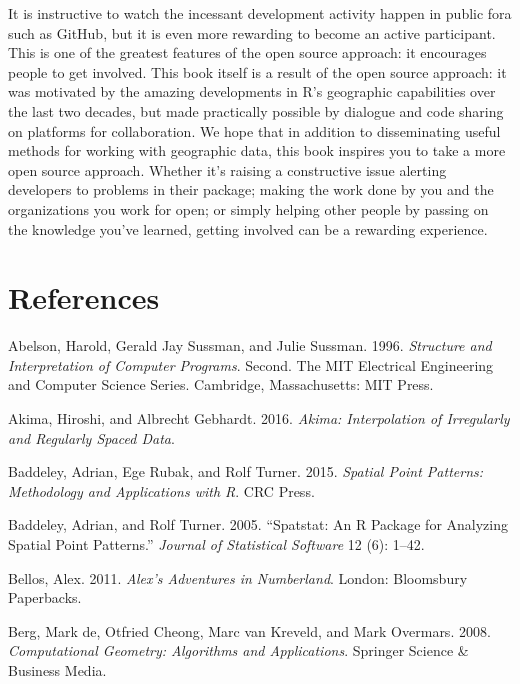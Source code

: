 \documentclass[]{krantz}
\begin{document}
It is instructive to watch the incessant development activity happen in public fora such as GitHub, but it is even more rewarding to become an active participant.
This is one of the greatest features of the open source approach: it encourages people to get involved.
This book itself is a result of the open source approach:
it was motivated by the amazing developments in R's geographic capabilities over the last two decades, but made practically possible by dialogue and code sharing on platforms for collaboration.
We hope that in addition to disseminating useful methods for working with geographic data, this book inspires you to take a more open source approach.
Whether it's raising a constructive issue alerting developers to problems in their package; making the work done by you and the organizations you work for open; or simply helping other people by passing on the knowledge you've learned, getting involved can be a rewarding experience.

\hypertarget{references}{%
\section*{References}\label{references}}

\hypertarget{refs}{}
\leavevmode\hypertarget{ref-abelson_structure_1996}{}%
Abelson, Harold, Gerald Jay Sussman, and Julie Sussman. 1996. \emph{Structure and Interpretation of Computer Programs}. Second. The MIT Electrical Engineering and Computer Science Series. Cambridge, Massachusetts: MIT Press.

\leavevmode\hypertarget{ref-akima_akima_2016}{}%
Akima, Hiroshi, and Albrecht Gebhardt. 2016. \emph{Akima: Interpolation of Irregularly and Regularly Spaced Data}.

\leavevmode\hypertarget{ref-baddeley_spatial_2015}{}%
Baddeley, Adrian, Ege Rubak, and Rolf Turner. 2015. \emph{Spatial Point Patterns: Methodology and Applications with R}. CRC Press.

\leavevmode\hypertarget{ref-baddeley_spatstat_2005}{}%
Baddeley, Adrian, and Rolf Turner. 2005. ``Spatstat: An R Package for Analyzing Spatial Point Patterns.'' \emph{Journal of Statistical Software} 12 (6): 1--42.

\leavevmode\hypertarget{ref-bellos_alex_2011}{}%
Bellos, Alex. 2011. \emph{Alex's Adventures in Numberland}. London: Bloomsbury Paperbacks.

\leavevmode\hypertarget{ref-berg_computational_2008}{}%
Berg, Mark de, Otfried Cheong, Marc van Kreveld, and Mark Overmars. 2008. \emph{Computational Geometry: Algorithms and Applications}. Springer Science \& Business Media.
\end{document}

